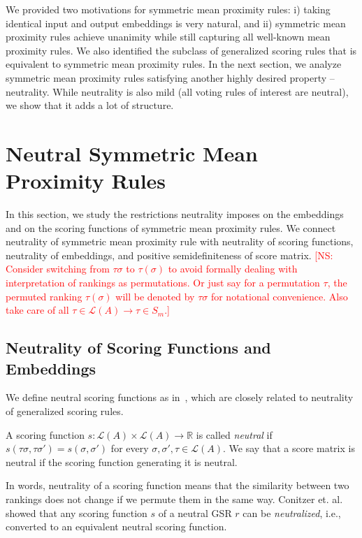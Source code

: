 \documentclass[10pt,letterpaper]{article}
\newcommand{\calL}{{\mathcal{L}}}
\newcommand{\rank}{{\calL(A)}}
\newenvironment{definition}[1][Definition]{\begin{trivlist}
\item[\hskip \labelsep {\bfseries #1}]}{\end{trivlist}}
\newcommand{\kibitz}[2]{\ifnum\Comments=1\textcolor{#1}{#2}\fi}
\newcommand{\cns}[1]{\kibitz{red} {[NS: #1]}}
\begin{document}

We provided two motivations for symmetric mean proximity rules: i) taking identical input and output embeddings is very natural, and ii) symmetric mean proximity rules achieve unanimity while still capturing all well-known mean proximity rules. We also identified the subclass of generalized scoring rules that is equivalent to symmetric mean proximity rules. In the next section, we analyze symmetric mean proximity rules satisfying another highly desired property -- neutrality. While neutrality is also mild (all voting rules of interest are neutral), we show that it adds a lot of structure. 


\section{Neutral Symmetric Mean Proximity Rules}

In this section, we study the restrictions neutrality imposes on the embeddings and on the scoring functions of symmetric mean proximity rules. We connect neutrality of symmetric mean proximity rule with neutrality of scoring functions, neutrality of embeddings, and positive semidefiniteness of score matrix. 
\cns{Consider switching from $\tau \sigma$ to $\tau(\sigma)$ to avoid formally dealing with interpretation of rankings as permutations. Or just say for a permutation $\tau$, the permuted ranking $\tau(\sigma)$ will be denoted by $\tau \sigma$ for notational convenience. Also take care of all $\tau \in \rank \rightarrow \tau \in S_m$.}


\subsection{Neutrality of Scoring Functions and Embeddings}
We define neutral scoring functions as in~\cite{CRX09}, which are closely related to neutrality of generalized scoring rules. 

\begin{definition}[Neutral Scoring Function]
A scoring function $s: \rank \times \rank \rightarrow \mathbb{R}$ is called \emph{neutral} if $s(\tau \sigma, \tau \sigma') = s(\sigma,\sigma')$ for every $\sigma,\sigma',\tau \in \rank$. We say that a score matrix is neutral if the scoring function generating it is neutral. 
\end{definition}
In words, neutrality of a scoring function means that the similarity between two rankings does not change if we permute them in the same way. Conitzer et. al.~\cite{CRX09} showed that any scoring function $s$ of a neutral GSR $r$ can be \emph{neutralized}, i.e., converted to an equivalent neutral scoring function.
\end{document}
